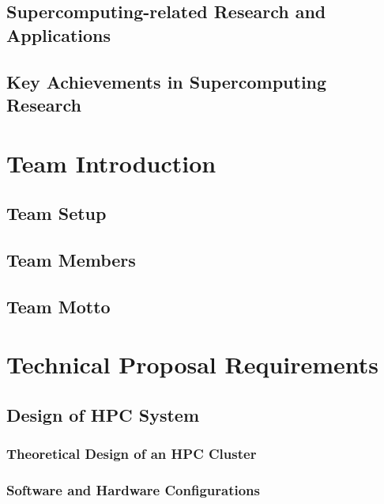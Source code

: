 \documentclass[a4paper,12pt]{article}
\begin{document}
\subsection{Supercomputing-related Research and Applications}

\subsection{Key Achievements in Supercomputing Research}

\newpage

\section{Team Introduction}

\subsection{Team Setup}

\subsection{Team Members}

\subsection{Team Motto}

\newpage

\section{Technical Proposal Requirements}

\subsection{Design of HPC System}

\subsubsection{Theoretical Design of an HPC Cluster}

\subsubsection{Software and Hardware Configurations}
\end{document}
